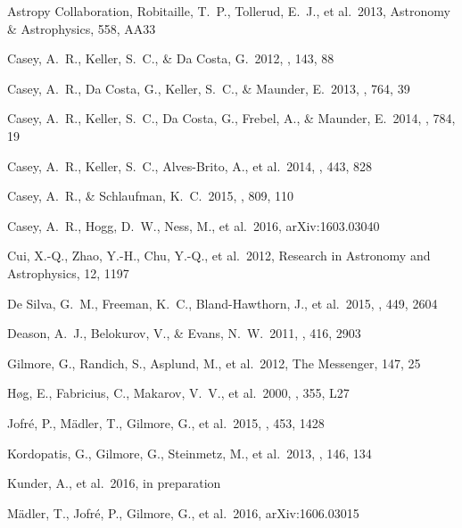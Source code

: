 \documentclass[preprint,trackchanges]{aastex}
\begin{document}
\begin{thebibliography}{dummy}
 Astropy Collaboration, Robitaille, T.~P., Tollerud, E.~J., et al.\ 2013, Astronomy \& Astrophysics, 558, AA33

 Casey, A.~R., Keller, S.~C., \& Da Costa, G.\ 2012, \aj, 143, 88 

 Casey, A.~R., Da Costa, G., Keller, S.~C., \& Maunder, E.\ 2013, \apj, 764, 39 

 Casey, A.~R., Keller, S.~C., Da Costa, G., Frebel, A., \& Maunder, E.\ 2014, \apj, 784, 19 

 Casey, A.~R., Keller, S.~C., Alves-Brito, A., et al.\ 2014, \mnras, 443, 828 

 Casey, A.~R., \& Schlaufman, K.~C.\ 2015, \apj, 809, 110 

 Casey, A.~R., Hogg, D.~W., Ness, M., et al.\ 2016, arXiv:1603.03040 

 Cui, X.-Q., Zhao, Y.-H., Chu, Y.-Q., et al.\ 2012, Research in Astronomy and Astrophysics, 12, 1197 

 De Silva, G.~M., Freeman, K.~C., Bland-Hawthorn, J., et al.\ 2015, \mnras, 449, 2604 

 Deason, A.~J., Belokurov, V., \& Evans, N.~W.\ 2011, \mnras, 416, 2903 

 Gilmore, G., Randich, S., Asplund, M., et al.\ 2012, The Messenger, 147, 25 

 H{\o}g, E., Fabricius, C., Makarov, V.~V., et al.\ 2000, \aap, 355, L27 

 Jofr{\'e}, P., M{\"a}dler, T., Gilmore, G., et al.\ 2015, \mnras, 453, 1428 

 Kordopatis, G., Gilmore, G., Steinmetz, M., et al.\ 2013, \aj, 146, 134 

 Kunder, A., et al.\ 2016, in preparation

 M{\"a}dler, T., Jofr{\'e}, P., Gilmore, G., et al.\ 2016, arXiv:1606.03015 


\end{thebibliography}
\end{document}
